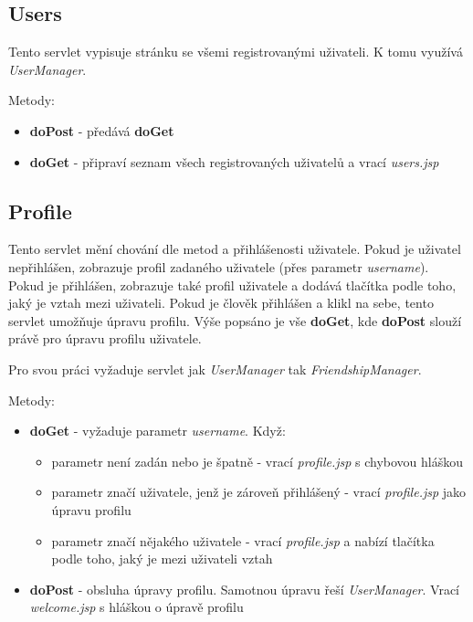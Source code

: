 \documentclass[
12pt,
a4paper,
pdftex,
czech,
titlepage
]{report}
\begin{document}
\subsection{Users}

Tento servlet vypisuje stránku se všemi registrovanými uživateli. K tomu využívá \textit{UserManager}.

Metody:
\begin{itemize}
\item \textbf{doPost} - předává \textbf{doGet}
\item \textbf{doGet} - připraví seznam všech registrovaných uživatelů a vrací \textit{users.jsp}
\end{itemize}

\subsection{Profile}

Tento servlet mění chování dle metod a přihlášenosti uživatele. Pokud je uživatel nepřihlášen, zobrazuje profil zadaného uživatele (přes parametr \textit{username}). Pokud je přihlášen, zobrazuje také profil uživatele a dodává tlačítka podle toho, jaký je vztah mezi uživateli. Pokud je člověk přihlášen a klikl na sebe, tento servlet umožňuje úpravu profilu. Výše popsáno je vše \textbf{doGet}, kde \textbf{doPost} slouží právě pro úpravu profilu uživatele.

Pro svou práci vyžaduje servlet jak \textit{UserManager} tak \textit{FriendshipManager}.

Metody:
\begin{itemize}
\item \textbf{doGet} - vyžaduje parametr \textit{username}. Když:
\begin{itemize}
\item parametr není zadán nebo je špatně - vrací \textit{profile.jsp} s chybovou hláškou
\item parametr značí uživatele, jenž je zároveň přihlášený - vrací \textit{profile.jsp} jako úpravu profilu
\item parametr značí nějakého uživatele - vrací \textit{profile.jsp} a nabízí tlačítka podle toho, jaký je mezi uživateli vztah
\end{itemize}
\item \textbf{doPost} - obsluha úpravy profilu. Samotnou úpravu řeší \textit{UserManager}. Vrací \textit{welcome.jsp} s hláškou o úpravě profilu
\end{itemize}
\end{document}
